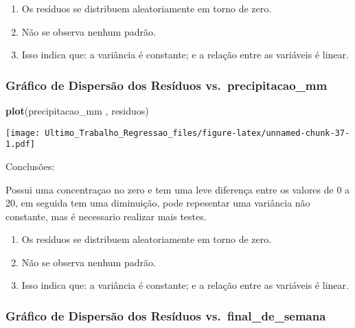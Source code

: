\documentclass[
]{article}
\newenvironment{Shaded}{\begin{snugshade}}{\end{snugshade}}
\newcommand{\FunctionTok}[1]{\textcolor[rgb]{0.13,0.29,0.53}{\textbf{#1}}}
\newcommand{\NormalTok}[1]{#1}
\providecommand{\tightlist}{%
  \setlength{\itemsep}{0pt}\setlength{\parskip}{0pt}}
\begin{document}
\begin{enumerate}
\def\labelenumi{\arabic{enumi}.}
\tightlist
\item
  Os resíduos se distribuem aleatoriamente em torno de zero.
\item
  Não se observa nenhum padrão.
\item
  Isso indica que: a variância é constante; e a relação entre as
  variáveis é linear.
\end{enumerate}

\hypertarget{gruxe1fico-de-dispersuxe3o-dos-resuxedduos-vs.-precipitacao_mm}{%
\subsubsection{Gráfico de Dispersão dos Resíduos
vs.~precipitacao\_mm}\label{gruxe1fico-de-dispersuxe3o-dos-resuxedduos-vs.-precipitacao_mm}}

\begin{Shaded}
\begin{Highlighting}[]
\FunctionTok{plot}\NormalTok{(precipitacao\_mm , residuos)}
\end{Highlighting}
\end{Shaded}

\texttt{[image: Ultimo\_Trabalho\_Regressao\_files/figure-latex/unnamed-chunk-37-1.pdf]}

Conclusões:

Possui uma concentraçao no zero e tem uma leve diferença entre os
valores de 0 a 20, em seguida tem uma diminuição, pode repesentar uma
variância não constante, mas é necessario realizar mais testes.

\begin{enumerate}
\def\labelenumi{\arabic{enumi}.}
\tightlist
\item
  Os resíduos se distribuem aleatoriamente em torno de zero.
\item
  Não se observa nenhum padrão.
\item
  Isso indica que: a variância é constante; e a relação entre as
  variáveis é linear.
\end{enumerate}

\hypertarget{gruxe1fico-de-dispersuxe3o-dos-resuxedduos-vs.-final_de_semana}{%
\subsubsection{Gráfico de Dispersão dos Resíduos
vs.~final\_de\_semana}\label{gruxe1fico-de-dispersuxe3o-dos-resuxedduos-vs.-final_de_semana}}
\end{document}
